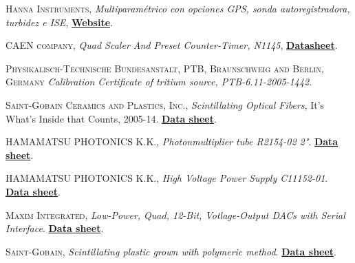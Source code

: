 \begin{thebibliography}{100}
 \textsc{Hanna Instruments},
\textit{Multiparamétrico con opciones GPS, sonda autoregistradora, turbidez e ISE}, \href{https://www.hannainst.es/parametros/4654-multiparametrico-portatil-con-portasondas-multisensor-ph-orp-ce-od-temperatura.html#/507-cable_m-4_m/512-portasondas-si/513-portasondas_registrador-no/514-gps-no/515-turbidez-no}{\textbf{Website}}.


 \textsc{CAEN company},
\textit{Quad Scaler And Preset Counter-Timer, N1145}, \href{https://www.caen.it/products/n1145/}{\textbf{Datasheet}}.

 \textsc{Physikalisch-Technische Bundesanstalt, PTB, Braunschweig and Berlin, Germany}
\textit{Calibration Certificate of tritium source, PTB-6.11-2005-1442}.

 \textsc{Saint-Gobain Ceramics and Plastics, Inc.},
\textit{Scintillating Optical Fibers}, It's What's Inside that Counts, 2005-14. \href{https://www.crystals.saint-gobain.com/products/scintillating-fiber}{\textbf{Data sheet}}. 

 \textsc{HAMAMATSU PHOTONICS K.K.},
\textit{Photonmultiplier tube R2154-02 2"}. \href{https://www.hamamatsu.com/eu/en/product/type/R2154-02/index.html}{\textbf{Data sheet}}.

 \textsc{HAMAMATSU PHOTONICS K.K.},
\textit{High Voltage Power Supply C11152-01}. \href{https://www.hamamatsu.com/jp/en/product/type/C11152-01/index.html}{\textbf{Data sheet}}.

 \textsc{Maxim Integrated},
\textit{Low-Power, Quad, 12-Bit, Votlage-Output DACs with Serial Interface}. \href{https://www.maximintegrated.com/en/products/analog/data-converters/digital-to-analog-converters/MAX5500.html}{\textbf{Data sheet}}.

 \textsc{Saint-Gobain},
\textit{Scintillating plastic grown with polymeric method}. \href{https://www.epic-crystal.com/others/plastic-scintillator.html}{\textbf{Data sheet}}.


\end{thebibliography}
